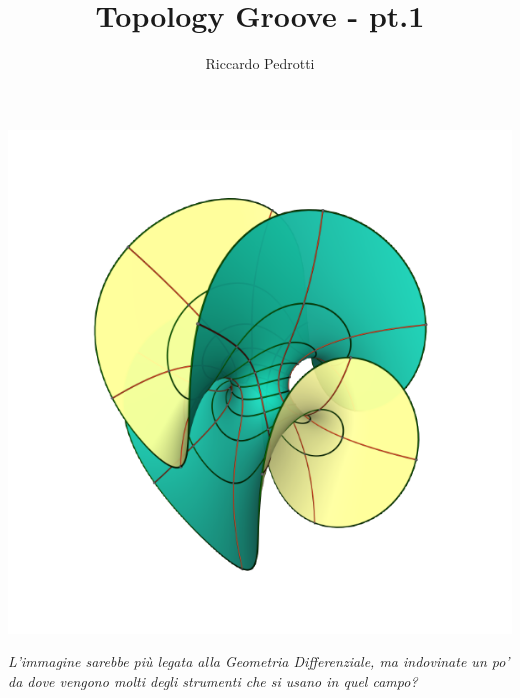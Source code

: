\documentclass[10pt,a4paper]{article}
\author{Riccardo Pedrotti}
\title{Topology Groove - pt.1}
\theoremstyle{definition}
\theoremstyle{plain}
\theoremstyle{remark}
\theoremstyle{remark}
\begin{document}
\maketitle
\vspace{1.5 cm}
\begin{center}
\includegraphics[scale=0.8]{enneper.png}
\end{center}
\vspace{1 cm}

\begin{center}
\textit{L'immagine sarebbe più legata alla Geometria Differenziale, ma
  indovinate un po' da dove vengono molti degli strumenti che si usano in quel
  campo?}
\end{center}
\newpage
\end{document}
